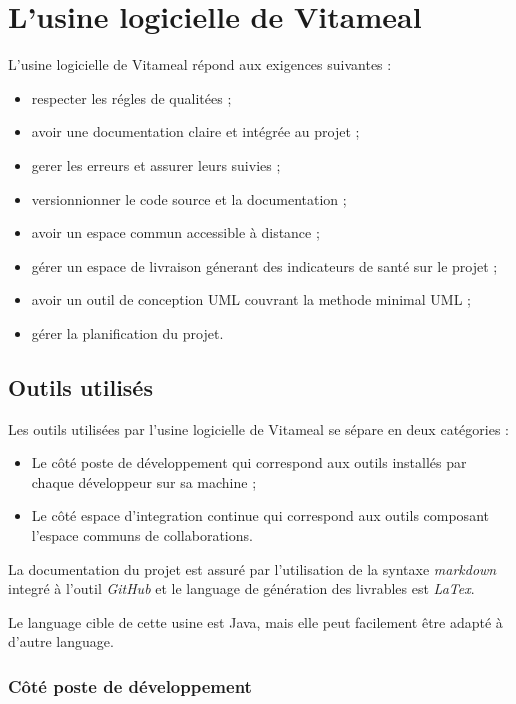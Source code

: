 \section{L'usine logicielle de
Vitameal}\label{lusine-logicielle-de-vitameal}

L'usine logicielle de Vitameal répond aux exigences suivantes :

\begin{itemize}
\tightlist
\item
  respecter les régles de qualitées ;
\item
  avoir une documentation claire et intégrée au projet ;
\item
  gerer les erreurs et assurer leurs suivies ;
\item
  versionnionner le code source et la documentation ;
\item
  avoir un espace commun accessible à distance ;
\item
  gérer un espace de livraison génerant des indicateurs de santé sur le
  projet ;
\item
  avoir un outil de conception UML couvrant la methode minimal UML ;
\item
  gérer la planification du projet.
\end{itemize}

\subsection{Outils utilisés}\label{outils-utilisuxe9s}

Les outils utilisées par l'usine logicielle de Vitameal se sépare en
deux catégories :

\begin{itemize}
\tightlist
\item
  Le côté poste de développement qui correspond aux outils installés par
  chaque développeur sur sa machine ;
\item
  Le côté espace d'integration continue qui correspond aux outils
  composant l'espace communs de collaborations.
\end{itemize}

La documentation du projet est assuré par l'utilisation de la syntaxe
\emph{markdown} integré à l'outil \emph{GitHub} et le language de
génération des livrables est \emph{LaTex}.

Le language cible de cette usine est Java, mais elle peut facilement
être adapté à d'autre language.

\subsubsection{Côté poste de
développement}\label{cuxf4tuxe9-poste-de-duxe9veloppement}

